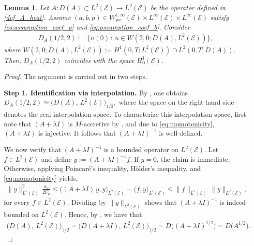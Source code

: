 \documentclass[a4paper, 10pt, english]{article}
\def\to{\rightarrow}
\newtheorem{lemma}{Lemma}[section]
\begin{document}
\begin{lemma}\label{lemma:fractional_power}
Let $A:D(A)\subset L^2(\mathcal{E})\to L^2(\mathcal E)$ be the operator defined in \eqref{def_A_heat}. Assume $(a,b,p)\in W^{1,\infty}_{pw}(\mathcal{E})\times L^{\infty}(\mathcal{E})\times L^{\infty}(\mathcal{E})$ satisfy \eqref{eq:assumption_coef_a} and \eqref{eq:assumption_coef_b}. Consider 
\begin{align*}
    D_{A}(1/2,2):=\{u(0)\,:\, u\in W(2,0; D(A),L^2(\mathcal{E}))\},
\end{align*}
where $ W(2,0;D(A),L^2(\mathcal{E})):= H^1(0,T;L^2(\mathcal{E}))\cap L^2(0,T; D(A))$. Then, $D_{A}(1/2,2)$ coincides with the space $H^1_{0}(\mathcal{E})$. 
\end{lemma}
\begin{proof}
The argument is carried out in two steps.

\smallbreak
\noindent
\textbf{Step 1. Identification via interpolation.}
By \cite[Proposition~4.3]{Bensoussan}, one obtains $D_{A}(1/2,2) \simeq \bigl(D(A),\,L^2(\mathcal{E})\bigr)_{1/2},$ where the space on the right-hand side denotes the real interpolation space. To characterize this interpolation space, first note that $(A + \lambda I)$ is $M$-accretive by , and due to \eqref{eq:momotonicity}, $(A + \lambda I)$ is injective. It follows that $(A + \lambda I)^{-1}$ is well-defined.

We now verify that $(A + \lambda I)^{-1}$ is a bounded operator on $L^2(\mathcal{E})$. Let $f \in L^2(\mathcal{E})$ and define $y := (A+\lambda I)^{-1} f$. If $y=0$, the claim is immediate. Otherwise, applying Poincaré's inequality, Hölder's inequality, and \eqref{eq:momotonicity} yields,
\begin{align*}
\|y\|_{L^2(\mathcal{E})}^2 \,\frac{a_0}{2C_p}
\le
\bigl((A+\lambda I)\,y,y\bigr)_{L^2(\mathcal{E})}
=
\bigl(f,y\bigr)_{L^2(\mathcal{E})}
\le
\|f\|_{L^2(\mathcal{E})}\,\|y\|_{L^2(\mathcal{E})}, 
\end{align*}
for every $f\in L^2(\mathcal{E})$. Dividing by $\|y\|_{L^2(\mathcal{E})}$ shows that $(A + \lambda I)^{-1}$ is indeed bounded on $L^2(\mathcal{E})$. Hence, by \cite[Proposition~6.1]{Bensoussan}, we have that
\begin{align}\label{eq:interpolations_frac}
\bigl(D(A),\,L^2(\mathcal{E})\bigr)_{1/2}
=
\bigl(D(A+\lambda I),\,L^2(\mathcal{E})\bigr)_{1/2}
=
D\bigl((A+\lambda I)^{1/2}\bigr)
=
D\bigl(A^{1/2}\bigr).
\end{align}


\end{proof}
\end{document}
